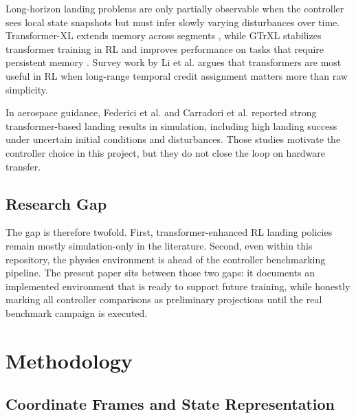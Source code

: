 \documentclass[10pt,twocolumn]{article}
\begin{document}
Long-horizon landing problems are only partially observable when the controller sees local state snapshots but must infer slowly varying disturbances over time. Transformer-XL extends memory across segments \cite{dai2019}, while GTrXL stabilizes transformer training in RL and improves performance on tasks that require persistent memory \cite{parisotto2020}. Survey work by Li et al. \cite{li2023} argues that transformers are most useful in RL when long-range temporal credit assignment matters more than raw simplicity.

In aerospace guidance, Federici et al. \cite{federici2024} and Carradori et al. \cite{carradori2025} reported strong transformer-based landing results in simulation, including high landing success under uncertain initial conditions and disturbances. Those studies motivate the controller choice in this project, but they do not close the loop on hardware transfer.

\subsection{Research Gap}

The gap is therefore twofold. First, transformer-enhanced RL landing policies remain mostly simulation-only in the literature. Second, even within this repository, the physics environment is ahead of the controller benchmarking pipeline. The present paper sits between those two gaps: it documents an implemented environment that is ready to support future training, while honestly marking all controller comparisons as preliminary projections until the real benchmark campaign is executed.

\section{Methodology}

\subsection{Coordinate Frames and State Representation}
\end{document}
